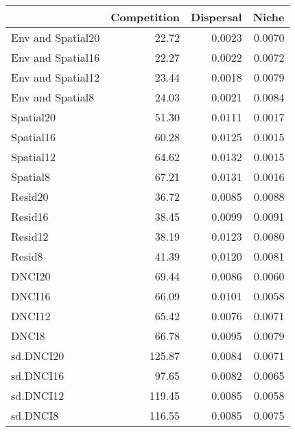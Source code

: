 \begin{longtable}{l|rrr}
\toprule
\multicolumn{1}{l}{} & Competition & Dispersal & Niche \\ 
\midrule
Env and Spatial20 & 22.72 & 0.0023 & 0.0070 \\ 
Env and Spatial16 & 22.27 & 0.0022 & 0.0072 \\ 
Env and Spatial12 & 23.44 & 0.0018 & 0.0079 \\ 
Env and Spatial8 & 24.03 & 0.0021 & 0.0084 \\ 
Spatial20 & 51.30 & 0.0111 & 0.0017 \\ 
Spatial16 & 60.28 & 0.0125 & 0.0015 \\ 
Spatial12 & 64.62 & 0.0132 & 0.0015 \\ 
Spatial8 & 67.21 & 0.0131 & 0.0016 \\ 
Resid20 & 36.72 & 0.0085 & 0.0088 \\ 
Resid16 & 38.45 & 0.0099 & 0.0091 \\ 
Resid12 & 38.19 & 0.0123 & 0.0080 \\ 
Resid8 & 41.39 & 0.0120 & 0.0081 \\ 
DNCI20 & 69.44 & 0.0086 & 0.0060 \\ 
DNCI16 & 66.09 & 0.0101 & 0.0058 \\ 
DNCI12 & 65.42 & 0.0076 & 0.0071 \\ 
DNCI8 & 66.78 & 0.0095 & 0.0079 \\ 
sd.DNCI20 & 125.87 & 0.0084 & 0.0071 \\ 
sd.DNCI16 & 97.65 & 0.0082 & 0.0065 \\ 
sd.DNCI12 & 119.45 & 0.0085 & 0.0058 \\ 
sd.DNCI8 & 116.55 & 0.0085 & 0.0075 \\ 
\bottomrule
\end{longtable}

